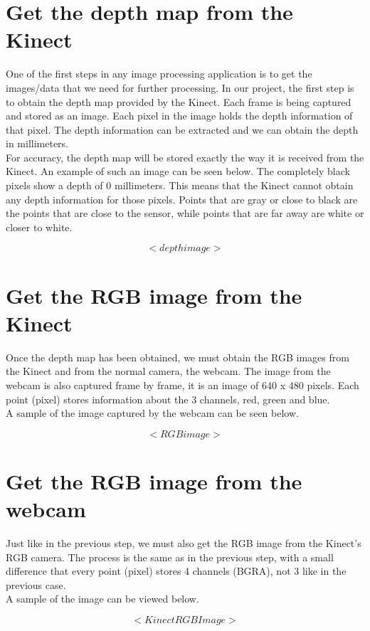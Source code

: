 \section{Get the depth map from the Kinect}
\noindent
One of the first steps in any image processing application is to get the images/data that we need for further processing. In our project, the first step is to obtain the depth map provided by the Kinect. Each frame is being captured and stored as an image. Each pixel in the image holds the depth information of that pixel. The depth information can be extracted and we can obtain the depth in millimeters.
\\
For accuracy, the depth map will be stored exactly the way it is received from the Kinect. An example of such an image can be seen below. The completely black pixels show a depth of 0 millimeters. This means that the Kinect cannot obtain any depth information for those pixels. Points that are gray or close to black are the points that are close to the sensor, while points that are far away are white or closer to white. 

$$ < depth image > $$

\section{Get the RGB image from the Kinect}
\noindent
Once the depth map has been obtained, we must obtain the RGB images from the Kinect and from the normal camera, the webcam. The image from the webcam is also captured frame by frame, it is an image of 640 x 480 pixels. Each point (pixel) stores information about the 3 channels, red, green and blue. 
\\
A sample of the image captured by the webcam can be seen below.

$$ < RGB image > $$

\section{Get the RGB image from the webcam}
\noindent
Just like in the previous step, we must also get the RGB image from the Kinect's RGB camera. The process is the same as in the previous step, with a small difference that every point (pixel) stores 4 channels (BGRA), not 3 like in the previous case. 
\\ 
A sample of the image can be viewed below. 

$$ < Kinect RGB Image > $$

